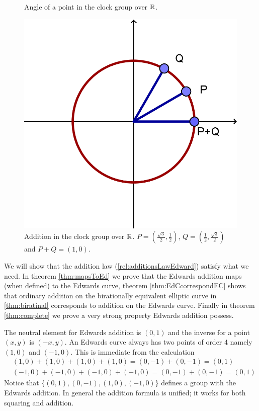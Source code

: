 \begin{ex}
\begin{figure}[htp]
\begin{minipage}[b]{0.5\linewidth}
\caption{Angle of a point in the clock group over $\mathbb{R}$.}
\label{fig:clockAngle}
\end{minipage}
\hspace{0.5cm}
\begin{minipage}[b]{0.5\linewidth}
\centering
\includegraphics[scale=1]{clock_addition.png}
\caption{Addition in the clock group over $\mathbb{R}$. $P=\left(\frac{\sqrt{3}}{2},\frac{1}{2}\right)$, $Q=\left(\frac{1}{2},\frac{\sqrt{3}}{2}\right)$ and $P+Q=(1,0)$.}
\label{fig:clockAddition}
\end{minipage}
\end{figure}
\end{ex}
We will show that the addition law (\ref{rel:additionsLawEdward}) satisfy what we need. In theorem \ref{thm:mapsToEd} we prove that the Edwards addition maps (when defined) to the Edwards curve, theorem \ref{thm:EdCcorrespondEC} shows that ordinary addition on the birationally equivalent elliptic curve in \ref{thm:biratinal} corresponds to addition on the Edwards curve. Finally in theorem \ref{thm:complete} we prove a very strong property Edwards addition possess. 
\begin{rem}
The neutral element for Edwards addition is $(0,1)$ and the inverse for a point $(x,y)$ is $(-x,y)$. An Edwards curve always has two points of order 4 namely $(1,0)$ and $(-1,0)$. This is immediate from the calculation
\begin{align*}
&(1,0)+(1,0)+(1,0)+(1,0)=(0,-1)+(0,-1)=(0,1) \\
&(-1,0)+(-1,0)+(-1,0)+(-1,0)=(0,-1)+(0,-1)=(0,1)
\end{align*}
Notice that $\{(0,1),(0,-1),(1,0),(-1,0)\}$ defines a group with the Edwards addition. In general the addition formula is unified; it works for both squaring and addition. 
\end{rem}
